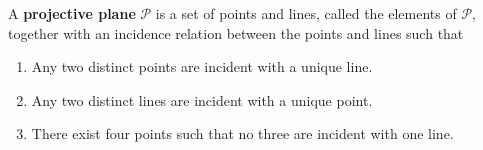 A \textbf{projective plane} $\mathcal{P}$ is a set of points and lines, called the elements of $\mathcal{P}$, together with an incidence relation between the points and lines such that
\begin{enumerate}
  \item[(i)] Any two distinct points are incident with a unique line.
  \item[(ii)] Any two distinct lines are incident with a unique point.
  \item[(iii)] There exist four points such that no three are incident with one line.
\end{enumerate}
